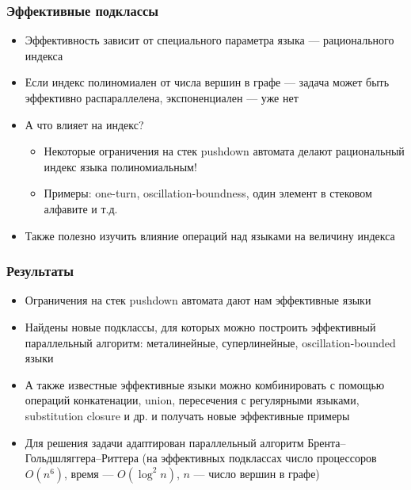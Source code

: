 \documentclass{beamer}
\begin{document}
\begin{frame}
\frametitle{Эффективные подклассы}
\begin{itemize}
\item Эффективность зависит от специального параметра языка --- рационального индекса
\item Если индекс полиномиален от числа вершин в графе --- задача может быть эффективно распараллелена, экспоненциален --- уже нет
\item А что влияет на индекс?
\begin{itemize}
\item Некоторые ограничения на стек pushdown автомата делают рациональный индекс языка полиномиальным!
\item Примеры: one-turn, oscillation-boundness, один элемент в стековом алфавите и т.д.
\end{itemize}
\item Также полезно изучить влияние операций над языками на величину индекса
\end{itemize}
\end{frame}

\begin{frame}
\frametitle{Результаты}
\begin{itemize}
\item Ограничения на стек  pushdown автомата дают нам эффективные языки
\item Найдены новые подклассы, для которых можно построить эффективный параллельный алгоритм: металинейные, суперлинейные, oscillation-bounded языки
\item А также известные эффективные языки можно комбинировать с помощью операций конкатенации, union, пересечения с регулярными языками, substitution closure и др. и получать новые эффективные примеры
\item Для решения задачи адаптирован параллельный алгоритм Брента--Гольдшляггера--Риттера  (на эффективных подклассах число процессоров $O(n^6)$, время --- $O(\log^2 n)$, $n$ --- число вершин в графе)
\end{itemize}
\end{frame}
\end{document}
